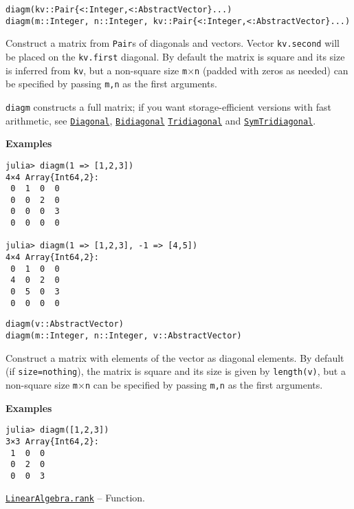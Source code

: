 \begin{adjustwidth}{2em}{0pt}


\begin{verbatim}
diagm(kv::Pair{<:Integer,<:AbstractVector}...)
diagm(m::Integer, n::Integer, kv::Pair{<:Integer,<:AbstractVector}...)
\end{verbatim}

Construct a matrix from \texttt{Pair}s of diagonals and vectors. Vector \texttt{kv.second} will be placed on the \texttt{kv.first} diagonal. By default the matrix is square and its size is inferred from \texttt{kv}, but a non-square size \texttt{m}×\texttt{n} (padded with zeros as needed) can be specified by passing \texttt{m,n} as the first arguments.

\texttt{diagm} constructs a full matrix; if you want storage-efficient versions with fast arithmetic, see \hyperlink{3300114559258360989}{\texttt{Diagonal}}, \hyperlink{6156150905679680892}{\texttt{Bidiagonal}} \hyperlink{17820886359515748171}{\texttt{Tridiagonal}} and \hyperlink{6062797780727203318}{\texttt{SymTridiagonal}}.

\textbf{Examples}


\begin{verbatim}
julia> diagm(1 => [1,2,3])
4×4 Array{Int64,2}:
 0  1  0  0
 0  0  2  0
 0  0  0  3
 0  0  0  0

julia> diagm(1 => [1,2,3], -1 => [4,5])
4×4 Array{Int64,2}:
 0  1  0  0
 4  0  2  0
 0  5  0  3
 0  0  0  0
\end{verbatim}




\begin{lstlisting}
diagm(v::AbstractVector)
diagm(m::Integer, n::Integer, v::AbstractVector)
\end{lstlisting}

Construct a matrix with elements of the vector as diagonal elements. By default (if \texttt{size=nothing}), the matrix is square and its size is given by \texttt{length(v)}, but a non-square size \texttt{m}×\texttt{n} can be specified by passing \texttt{m,n} as the first arguments.

\textbf{Examples}


\begin{verbatim}
julia> diagm([1,2,3])
3×3 Array{Int64,2}:
 1  0  0
 0  2  0
 0  0  3
\end{verbatim}



\end{adjustwidth}
\hypertarget{439390458422397873}{} 
\hyperlink{439390458422397873}{\texttt{LinearAlgebra.rank}}  -- {Function.}

